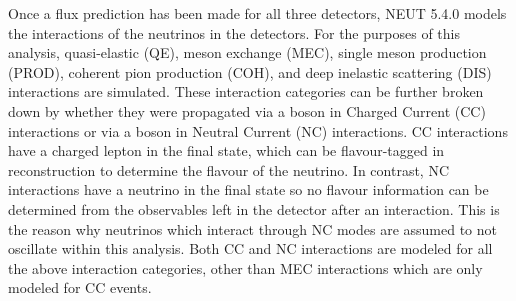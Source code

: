 Once a flux prediction has been made for all three detectors, NEUT 5.4.0 \cite{Hayato2021, neut} models the interactions of the neutrinos in the detectors. For the purposes of this analysis, quasi-elastic (QE), meson exchange (MEC), single meson production (PROD), coherent pion production (COH), and deep inelastic scattering (DIS) interactions are simulated. These interaction categories can be further broken down by whether they were propagated via a  boson in Charged Current (CC) interactions or via a  boson in Neutral Current (NC) interactions. CC interactions have a charged lepton in the final state, which can be flavour-tagged in reconstruction to determine the flavour of the neutrino. In contrast, NC interactions have a neutrino in the final state so no flavour information can be determined from the observables left in the detector after an interaction. This is the reason why neutrinos which interact through NC modes are assumed to not oscillate within this analysis. Both CC and NC interactions are modeled for all the above interaction categories, other than MEC interactions which are only modeled for CC events. 

